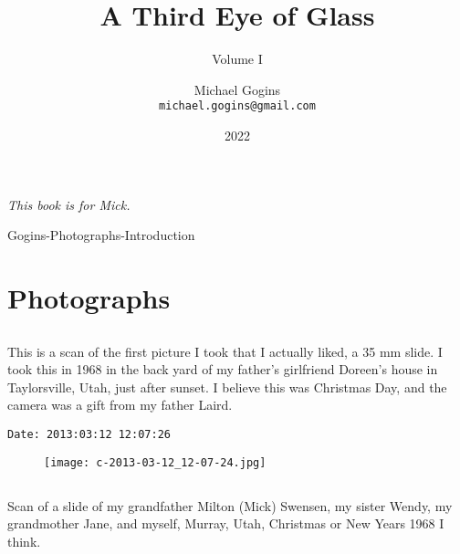 \documentclass[11pt,letter,DIV=14,paper=landscape]{scrbook}
\begin{document}
\frontmatter

\title{A Third Eye of Glass}
\subtitle{Volume I }
\author{Michael Gogins \\ \texttt{michael.gogins@gmail.com}}
\date{2022 }
\publishers{Irreducible Productions}

\maketitle
	


\begin{dedication}
\emph{This book is for Mick.}
\end{dedication}

\tableofcontents

\mainmatter
{}

\setlength{\columnsep}{3em}
\twocolumn

 {Gogins-Photographs-Introduction}	
	
\onecolumn
\chapter{Photographs}
\clearpage
\clearpage
\section{\protect{}}
\noindent This is a scan of the first picture I took that I actually liked, a 35 mm slide. I took this in 1968 in the back yard of my father's girlfriend Doreen's house in Taylorsville, Utah, just after sunset. I believe this was Christmas Day, and the camera was a gift from my father Laird.
\noindent
\begin{lstlisting}
Date: 2013:03:12 12:07:26
\end{lstlisting}
\clearpage

\begin{figure}
\texttt{[image: c-2013-03-12\_12-07-24.jpg]}
\end{figure}

\clearpage
\section{\protect{}}
\noindent Scan of a slide of my grandfather Milton (Mick) Swensen, my sister Wendy, my grandmother Jane, and myself, Murray, Utah, Christmas or New Years 1968 I think.
\noindent
\begin{lstlisting}
\end{lstlisting}
\clearpage
\end{document}
